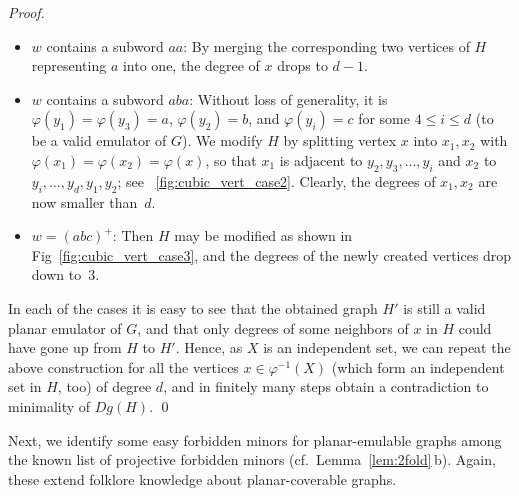 \documentclass[envcountsect,envcountsame]{llncs}
\renewenvironment{accumulate}{}{}
\begin{document}
\begin{accumulate}
\begin{proof}
\begin{itemize}
    \item $w$ contains a subword $aa$:
	By merging the corresponding two vertices of $H$ representing $a$ into one, 
	the degree of $x$ drops to $d-1$.
    \item $w$ contains a subword $aba$:
	Without loss of generality, it is $\varphi(y_1)=\varphi(y_3)=a$,
 $\varphi(y_2)=b$, and $\varphi(y_i)=c$ for some $4\leq i\leq d$
 (to be a valid emulator of $G$).
 We modify $H$ by splitting vertex $x$ into $x_1,x_2$ with
 $\varphi(x_1) = \varphi(x_2) = \varphi(x)$,
 so that $x_1$ is adjacent to $y_2,y_3,\dots,y_i$ and $x_2$ to
 $y_i,\dots,y_d,y_1,y_2$; see \figurename~\ref{fig:cubic_vert_case2}.
 Clearly, the degrees of $x_1,x_2$ are now smaller than~$d$.
    \item $w = (abc)^+$:
 Then $H$ may be modified as shown in Fig~\ref{fig:cubic_vert_case3},
 and the degrees of the newly created vertices drop down to~$3$.
\end{itemize}

In each of the cases it is easy to see that the obtained graph $H'$ is still 
a valid planar emulator of $G$,
and that only degrees of some neighbors of $x$ in $H$ 
could have gone up from $H$ to $H'$.
Hence, as $X$ is an independent set, we can repeat the above construction for
all the vertices $x\in\varphi^{-1}(X)$ (which form an independent set in
$H$, too) of degree $d$, and in finitely many steps obtain a contradiction
to minimality of $Dg(H)$.
\qed\end{proof}
\end{accumulate}


Next, we identify some easy forbidden minors for planar-emulable graphs
among the known list of projective forbidden minors (cf.\
Lemma~\ref{lem:2fold}\,b).
Again, these extend folklore knowledge about planar-coverable graphs.
\end{document}
